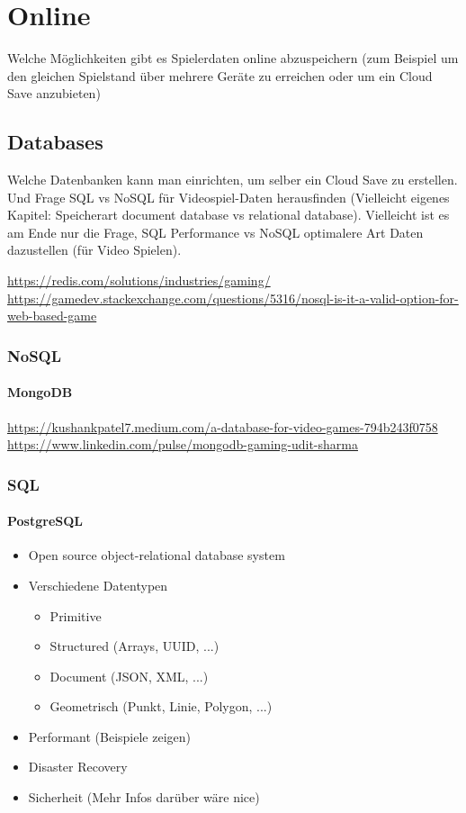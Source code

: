 \chapter{Online}\label{ch:online}
Welche Möglichkeiten gibt es Spielerdaten online abzuspeichern (zum Beispiel um den gleichen Spielstand über mehrere Geräte zu erreichen oder um ein Cloud Save anzubieten)

\section{Databases}
Welche Datenbanken kann man einrichten, um selber ein Cloud Save zu erstellen. Und Frage SQL vs NoSQL für Videospiel-Daten herausfinden (Vielleicht eigenes Kapitel: Speicherart document database vs relational database). Vielleicht ist es am Ende nur die Frage, SQL Performance vs NoSQL optimalere Art Daten dazustellen (für Video Spielen).

\url{https://redis.com/solutions/industries/gaming/}\\
\url{https://gamedev.stackexchange.com/questions/5316/nosql-is-it-a-valid-option-for-web-based-game}

\subsection{NoSQL}
\subsubsection{MongoDB}

\url{https://kushankpatel7.medium.com/a-database-for-video-games-794b243f0758}\\
\url{https://www.linkedin.com/pulse/mongodb-gaming-udit-sharma}

\subsection{SQL}
\subsubsection{PostgreSQL}
\begin{itemize}
    \item Open source object-relational database system
    \item Verschiedene Datentypen
    \begin{itemize}
        \item Primitive
        \item Structured (Arrays, UUID, ...)
        \item Document (JSON, XML, ...)
        \item Geometrisch (Punkt, Linie, Polygon, ...)
    \end{itemize}
    \item Performant (Beispiele zeigen)
    \item Disaster Recovery
    \item Sicherheit (Mehr Infos darüber wäre nice)
\end{itemize}

